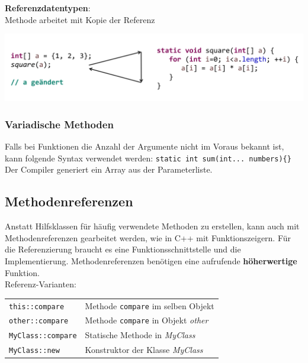{        \textbf{Referenzdatentypen}:\\
        Methode arbeitet mit Kopie der Referenz
        \begin{center}
            \includegraphics[width=0.9\columnwidth]{pictures/reference-params.png}    
        \end{center}
        \vspace{-0.3cm} 

    \subsubsection{Variadische Methoden}
        Falls bei Funktionen die Anzahl der Argumente nicht im Voraus bekannt ist, kann folgende
        Syntax verwendet werden: \verb|static int sum(int... numbers){}|\\
        Der Compiler generiert ein Array aus der Parameterliste.
        \vspace{-0.2cm}

\subsection{Methodenreferenzen}
    Anstatt Hilfsklassen für häufig verwendete Methoden zu erstellen, kann auch mit 
    Methodenreferenzen gearbeitet werden, wie in C++ mit Funktionszeigern. Für die Referenzierung braucht es
    eine Funktionsschnittstelle und die Implementierung. Methodenreferenzen benötigen eine aufrufende \textbf{höherwertige} Funktion. \\
    Referenz-Varianten:\\
    \begin{tabular}{ll}
        \verb|this::compare|    & Methode \verb|compare| im selben Objekt \\
        \verb|other::compare|   & Methode \verb|compare| in Objekt \textit{other} \\
        \verb|MyClass::compare| & Statische Methode in \textit{MyClass} \\
        \verb|MyClass::new|     & Konstruktor der Klasse \textit{MyClass} \\
    \end{tabular}
    \vspace{-0.1cm} 

}
